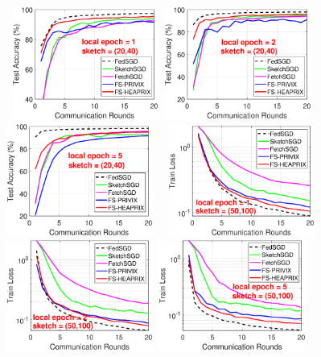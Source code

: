 \documentclass[sigconf, anonymous, review]{acmart}
\begin{document}
\begin{figure}[h]
\begin{center}
		\mbox{%
		\includegraphics[width=1.9in]{MNIST_figures/local1_sketch20_iid1_test_acc.eps} %
		\includegraphics[width=1.9in]{MNIST_figures/local2_sketch20_iid1_test_acc.eps} %
		\includegraphics[width=1.9in]{MNIST_figures/local5_sketch20_iid1_test_acc.eps}%
		}
		\mbox{%
		\includegraphics[width=1.9in]{MNIST_figures/local1_sketch50_iid1_train_loss.eps}%
		\includegraphics[width=1.9in]{MNIST_figures/local2_sketch50_iid1_train_loss.eps} %
		\includegraphics[width=1.9in]{MNIST_figures/local5_sketch50_iid1_train_loss.eps}}

\end{center}
\end{figure}
\end{document}
